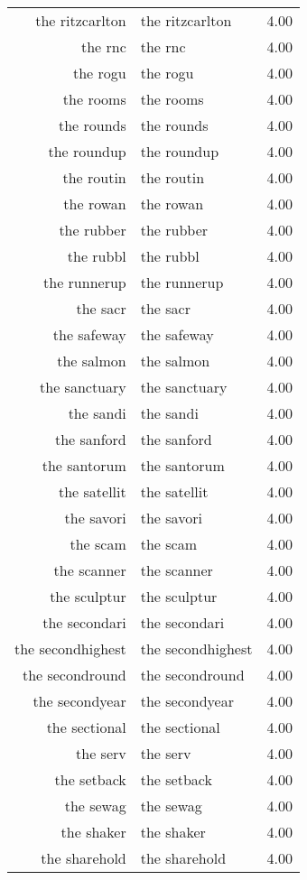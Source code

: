 \begin{table}[ht]
\begin{tabular}{rlr}
  the ritzcarlton & the ritzcarlton & 4.00 \\ 
  the rnc & the rnc & 4.00 \\ 
  the rogu & the rogu & 4.00 \\ 
  the rooms & the rooms & 4.00 \\ 
  the rounds & the rounds & 4.00 \\ 
  the roundup & the roundup & 4.00 \\ 
  the routin & the routin & 4.00 \\ 
  the rowan & the rowan & 4.00 \\ 
  the rubber & the rubber & 4.00 \\ 
  the rubbl & the rubbl & 4.00 \\ 
  the runnerup & the runnerup & 4.00 \\ 
  the sacr & the sacr & 4.00 \\ 
  the safeway & the safeway & 4.00 \\ 
  the salmon & the salmon & 4.00 \\ 
  the sanctuary & the sanctuary & 4.00 \\ 
  the sandi & the sandi & 4.00 \\ 
  the sanford & the sanford & 4.00 \\ 
  the santorum & the santorum & 4.00 \\ 
  the satellit & the satellit & 4.00 \\ 
  the savori & the savori & 4.00 \\ 
  the scam & the scam & 4.00 \\ 
  the scanner & the scanner & 4.00 \\ 
  the sculptur & the sculptur & 4.00 \\ 
  the secondari & the secondari & 4.00 \\ 
  the secondhighest & the secondhighest & 4.00 \\ 
  the secondround & the secondround & 4.00 \\ 
  the secondyear & the secondyear & 4.00 \\ 
  the sectional & the sectional & 4.00 \\ 
  the serv & the serv & 4.00 \\ 
  the setback & the setback & 4.00 \\ 
  the sewag & the sewag & 4.00 \\ 
  the shaker & the shaker & 4.00 \\ 
  the sharehold & the sharehold & 4.00 \\ 

\end{tabular}
\end{table}
